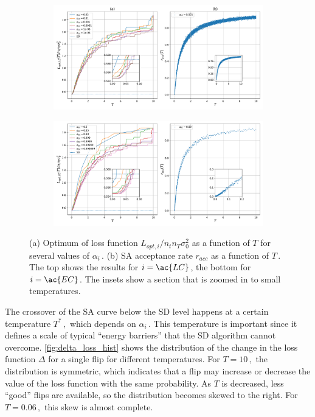 \documentclass[bachelor,       %
               oneside,        %
               BCOR10mm,       %
               ngerman, english %
               ]{GAUBM}
\begin{document}
\begin{figure}[H]
\centering
\begin{subfigure}[b]{\textwidth}
\includegraphics[width=1\linewidth]{Thesis/figures/opt_T_lam1p25_dphi0.5_seed0_lin_cool.pdf}
   \label{fig:opt-t-lin-cool} 
\end{subfigure}

\begin{subfigure}[b]{\textwidth}
   \includegraphics[width=1\linewidth]{Thesis/figures/opt_T_lam1p25_dphi0.5_seed0_exp_cool.pdf}
   \label{fig:opt-t-texp-cool}
\end{subfigure}
\caption{(a) Optimum of loss function $L_{opt,i}/n_tn_T\sigma_0^2$ as a function of $T$ for several values of $\alpha_i\,.$ (b) \ac{SA} acceptance rate $r_{acc}$ as a function of $T\,.$ The top shows the results for $i=\ac{LC}$, the bottom for $i=\ac{EC}$. The insets show a section that is zoomed in to small temperatures.}
\label{fig:opt-t}
\end{figure}

The crossover of the \ac{SA} curve below the \ac{SD} level happens at a certain temperature $T^*\,,$ which depends on $\alpha_i\,.$ This temperature is important since it defines a scale of typical \enquote{energy barriers} that the \ac{SD} algorithm cannot overcome. \autoref{fig:delta_loss_hist} shows the distribution of the change in the loss function $\Delta$ for a single flip for different temperatures. For $T=10\,,$ the distribution is symmetric, which indicates that a flip may increase or decrease the value of the loss function with the same probability. As $T$ is decreased, less \enquote{good} flips are available, so the distribution becomes skewed to the right. For $T=0.06\,,$ this skew is almost complete.
\end{document}
